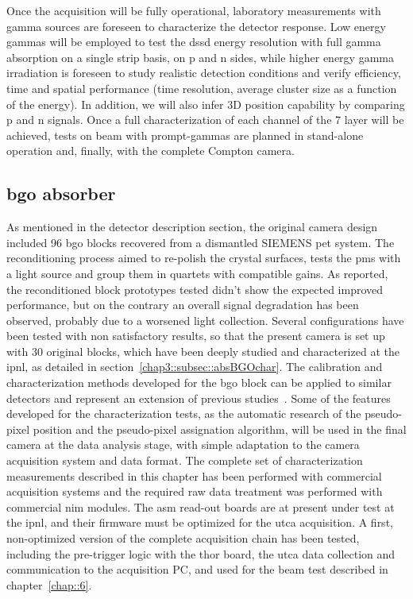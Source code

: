 Once the acquisition will be fully operational, laboratory measurements with gamma sources are foreseen to characterize the detector response. Low energy gammas will be employed to test the \gls{dssd} energy resolution with full gamma absorption on a single strip basis, on p and n sides, while higher energy gamma irradiation is foreseen to study realistic detection conditions and verify efficiency, time and spatial performance (time resolution, average cluster size as a function of the energy). In addition, we will also infer 3D position capability by comparing p and n signals. Once a full characterization of each channel of the 7 layer will be achieved, tests on beam with prompt-gammas are planned in stand-alone operation and, finally, with the complete Compton camera. 
   

\subsection{\gls{bgo} absorber}\label{chap3::subsec::absNext}

As mentioned in the detector description section, the original camera design included 96 \gls{bgo} blocks recovered from a dismantled SIEMENS \gls{pet} system. The reconditioning process aimed to re-polish the crystal surfaces, tests the \glspl{pm} with a light source and group them in quartets with compatible gains. As reported, the reconditioned block prototypes tested didn't show the expected improved performance, but on the contrary an overall signal degradation has been observed, probably due to a worsened light collection. Several configurations have been tested with non satisfactory results, so that the present camera is set up with 30 original blocks, which have been deeply studied and characterized at the \gls{ipnl}, as detailed in section~\ref{chap3::subsec::absBGOchar}. The calibration and characterization methods developed for the \gls{bgo} block can be applied to similar detectors and represent an extension of previous studies~\parencite{Rogers1994, Tornai1994, Golnik2015, HuesoGonzalez2015}. Some of the features developed for the characterization tests, as the automatic research of the pseudo-pixel position and the pseudo-pixel assignation algorithm, will be used in the final camera at the data analysis stage, with simple adaptation to the camera acquisition system and data format. The complete set of characterization measurements described in this chapter has been performed with commercial acquisition systems and the required raw data treatment was performed with commercial \gls{nim} modules. The \gls{asm} read-out boards are at present under test at the \gls{ipnl}, and their firmware must be optimized for the \gls{utca} acquisition. A first, non-optimized version of the complete acquisition chain has been tested, including the pre-trigger logic with the \gls{thor} board, the \gls{utca} data collection and communication to the acquisition PC, and used for the beam test described in chapter~\ref{chap::6}.

